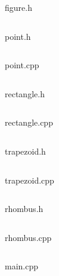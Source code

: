 \documentclass[12pt]{article}
\begin{document}
{\Huge figure.h}
\inputminted{C++}{figure.h}
    \pagebreak
    
{\Huge point.h}
\inputminted{C++}{point.h}
    \pagebreak

{\Huge point.cpp}
\inputminted{C++}{point.cpp}
    \pagebreak

{\Huge rectangle.h}
\inputminted{C++}{rectangle.h}
\pagebreak

{\Huge rectangle.cpp}
\inputminted{C++}{rectangle.cpp}
\pagebreak

{\Huge trapezoid.h}
\inputminted{C++}{trapezoid.h}
\pagebreak

{\Huge trapezoid.cpp}
\inputminted{C++}{trapezoid.cpp}
\pagebreak

{\Huge rhombus.h}
\inputminted{C++}{rhombus.h}
\pagebreak

{\Huge rhombus.cpp}
\inputminted{C++}{rhombus.cpp}
\pagebreak
    
{\Huge main.cpp}
\inputminted{C++}{main.cpp}
    \pagebreak
\end{document}

